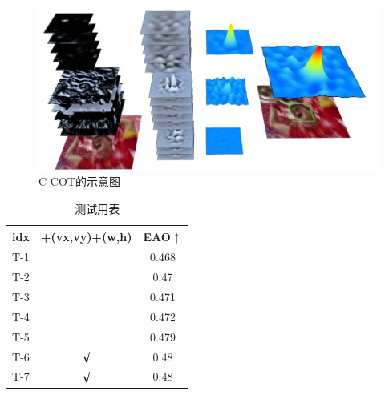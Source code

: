 \begin{figure}
    \centering
    \includegraphics[width=\textwidth]{figures/RW_CCOT.jpg}
    \caption{C-COT的示意图~\cite{C-COT}}
    \label{CCOT_1}
\end{figure}

\begin{table}
    \centering
    \caption{测试用表}
    \begin{tabular}{ccc}
    \hline
        idx & +(vx,vy)+(w,h) & EAO$\uparrow$ \\ \hline
        T-1 &  & 0.468 \\ 
        T-2 &  & 0.47 \\ 
        T-3 &  & 0.471 \\ 
        T-4 &  & 0.472 \\ 
        T-5 &  & 0.479 \\ 
        T-6 & $\surd$ & 0.48 \\ 
        T-7 & $\surd$ & 0.48 \\ \hline
    \end{tabular}
    \label{CCOT_2}
\end{table}